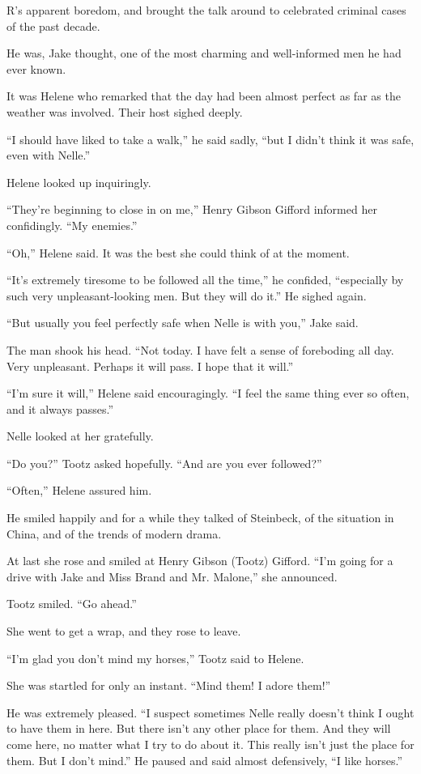 \documentclass{novel}
\begin{document}
R’s apparent boredom, and brought the talk around to celebrated criminal cases of the past decade.

He was, Jake thought, one of the most charming and well-informed men he had ever known.

It was Helene who remarked that the day had been almost perfect as far as the weather was involved. Their host sighed deeply.

“I should have liked to take a walk,” he said sadly, “but I didn’t think it was safe, even with Nelle.”

Helene looked up inquiringly.

“They’re beginning to close in on me,” Henry Gibson Gifford informed her confidingly. “My enemies.”

“Oh,” Helene said. It was the best she could think of at the moment.

“It’s extremely tiresome to be followed all the time,” he confided, “especially by such very unpleasant-looking men. But they will do it.” He sighed again.

“But usually you feel perfectly safe when Nelle is with you,” Jake said.

The man shook his head. “Not today. I have felt a sense of foreboding all day. Very unpleasant. Perhaps it will pass. I hope that it will.”

“I’m sure it will,” Helene said encouragingly. “I feel the same thing ever so often, and it always passes.”

Nelle looked at her gratefully.

“Do you?” Tootz asked hopefully. “And are you ever followed?”

“Often,” Helene assured him.

He smiled happily and for a while they talked of Steinbeck, of the situation in China, and of the trends of modern drama.

At last she rose and smiled at Henry Gibson (Tootz) Gifford. “I’m going for a drive with Jake and Miss Brand and Mr. Malone,” she announced.

Tootz smiled. “Go ahead.”

She went to get a wrap, and they rose to leave.

“I’m glad you don’t mind my horses,” Tootz said to Helene.

She was startled for only an instant. “Mind them! I adore them!”

He was extremely pleased. “I suspect sometimes Nelle really doesn’t think I ought to have them in here. But there isn’t any other place for them. And they will come here, no matter what I try to do about it. This really isn’t just the place for them. But I don’t mind.” He paused and said almost defensively, “I like horses.”
\end{document}
